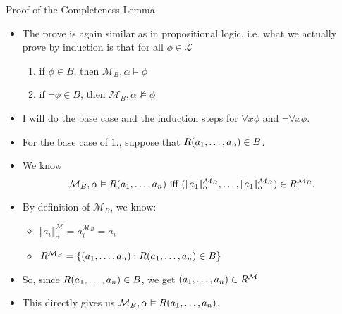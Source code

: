 \documentclass[../slides.tex]{subfiles}
\begin{document}
\begin{frame}{Proof of the Completeness Lemma}

  \begin{itemize}
  \item The prove is again similar as in propositional logic,
    i.e. what we actually prove by induction is that for all
    $\phi\in\mathcal{L}$
    \begin{enumerate}[1.]

                      \item if $\phi\in B$, then
                        $\mathcal{M}_B,\alpha\vDash\phi$

                        \item if $\neg\phi\in B$, then
                          $\mathcal{M}_B,\alpha\nvDash\phi$ 
                      
                        \end{enumerate}

             \item I will do the base case and the induction steps for
               $\forall x\phi$ and $\neg\forall x\phi$.

               \item For the base case of 1., suppose that
                 $R(a_1,\mathellipsis, a_n)\in B$.

                 \item We know \[\mathcal{M}_B,\alpha\vDash R(a_1,
                            \mathellipsis, a_n)\text{ iff }(\llbracket
                            a_1\rrbracket^{\mathcal{M}_B}_\alpha,
                            \mathellipsis, \llbracket
                            a_1\rrbracket^{\mathcal{M}_B}_\alpha)\in
                            R^{\mathcal{M}_B}.\]

                            \item By definition of $\mathcal{M}_B$, we
                              know:
                              \begin{itemize}
                              \item $\llbracket a_i\rrbracket^\mathcal{M}_\alpha=a_i^{\mathcal{M}_B}=a_i$
                                \item $R^{\mathcal{M}_B}=\{(a_1, \mathellipsis, a_n): R(a_1, \mathellipsis, a_n)\in B\}$
                                \end{itemize}

                                \item So, since $R(a_1,\mathellipsis,
                                  a_n)\in B$, we get $(a_1,
                                  \mathellipsis, a_n)\in
                                  R^\mathcal{M}$

                                  \item This directly gives us
                                    $\mathcal{M}_B,\alpha\vDash R(a_1,
                                    \mathellipsis, a_n)$.

  \end{itemize}

\end{frame}
\end{document}
